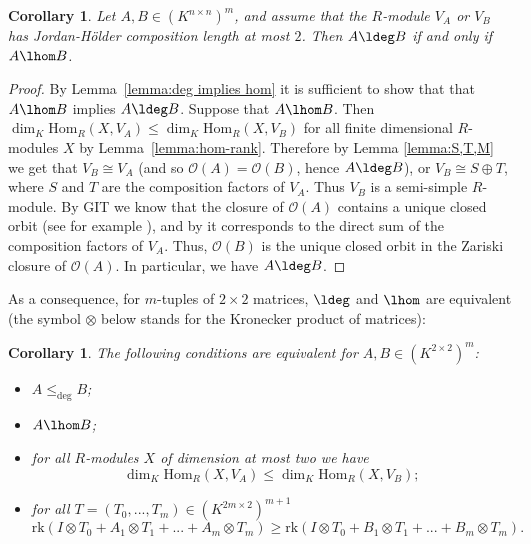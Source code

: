 \documentclass[12pt]{amsart}
\newtheorem{corollary}[theorem]{\bf Corollary}
\newcommand{\field}{K}
\renewcommand{\hom}{\mathrm{Hom}}
\begin{document}
\begin{corollary}
\label{cor:JHle2}
Let  $A,B\in (\field^{n\times n})^m$, and assume that 
the $R$-module $V_A$ or $V_B$ has 
Jordan-Hölder composition length at most $2$. 
Then $A\ldeg B$ if and only if $A\lhom B$.  
\end{corollary}

\begin{proof} By Lemma~\ref{lemma:deg implies hom} it is sufficient to show that 
    that $A \lhom B$ implies $A\ldeg B$. 
    Suppose that $A \lhom B$. 
    Then $\dim_{\field}\hom_{R}(X, V_A) \leq \dim_{\field}\hom_{R}(X, V_B)$ for 
    all finite dimensional $R$-modules $X$ by Lemma~\ref{lemma:hom-rank}. 
    Therefore by Lemma \ref{lemma:S,T,M} we get that $V_B\cong V_A$ (and so 
    $\mathcal{O}(A)=\mathcal{O}(B)$, hence  $A\ldeg B$), 
    or $V_B \cong S \oplus T$, where $S$ and $T$ are the composition factors of $V_A$. Thus $V_B$ is a semi-simple $R$-module. 
    By GIT we know that the closure of $\mathcal{O}(A)$ contains a unique closed orbit 
    (see for example \cite{MFK94}), 
    and by \cite{artin} it corresponds to the direct sum of the composition factors of $V_A$. Thus, $\mathcal{O}(B)$ is the unique closed orbit in the Zariski closure of $\mathcal{O}(A)$. 
    In particular, we have $A\ldeg B$. 
\end{proof}


As a consequence,  for $m$-tuples of $2 \times 2$ matrices, $\ldeg$ and $\lhom$ are equivalent 
(the symbol $\otimes$ below stands for the Kronecker product of matrices): 


\begin{corollary}
\label{Cor3.2}
    The following conditions are equivalent for $A,B \in (\field^{2\times 2})^m$:
    \begin{itemize}
        \item[(i)] $A \leq_{\deg} B$;
        \item[(ii)] $A\lhom B$; 
        \item [(iii)] for all $R$-modules $X$ of dimension at most two we have
            \begin{equation*}
            \label{EQ3}
                \dim_{\field}\hom_{R}(X, V_A) \leq \dim_{\field}\hom_{R}(X, V_B);
            \end{equation*}

                \item[(iv)] for all $T = (T_0, ..., T_m) \in (\field^{2m\times 2})^{m+1}$ 
            \begin{equation*}
                \mathrm{rk}(I \otimes T_0 + A_1 \otimes T_1 + ... + A_m \otimes T_m) \geq \mathrm{rk}(I \otimes T_0 + B_1 \otimes T_1 + ... + B_m \otimes T_m).
            \end{equation*}
    \end{itemize}
\end{corollary}
\end{document}

